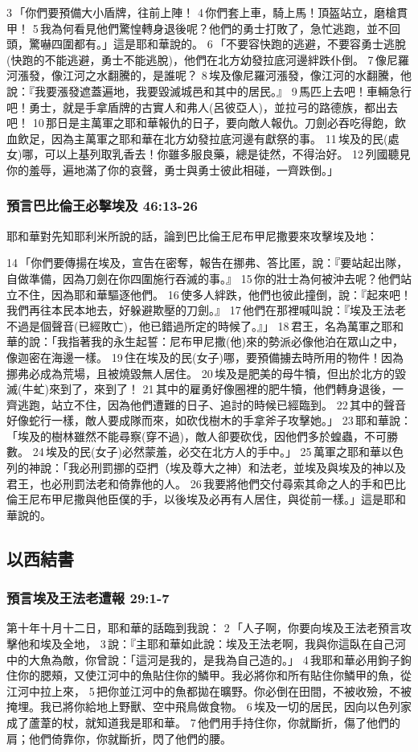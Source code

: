 3 「你們要預備大小盾牌，往前上陣！ 4 你們套上車，騎上馬！頂盔站立，磨槍貫甲！ 5 我為何看見他們驚惶轉身退後呢？他們的勇士打敗了，急忙逃跑，並不回頭，驚嚇四圍都有。」這是耶和華說的。 6 「不要容快跑的逃避，不要容勇士逃脫(快跑的不能逃避，勇士不能逃脫)，他們在北方幼發拉底河邊絆跌仆倒。 7 像尼羅河漲發，像江河之水翻騰的，是誰呢？ 8 埃及像尼羅河漲發，像江河的水翻騰，他說：『我要漲發遮蓋遍地，我要毀滅城邑和其中的居民。』 9 馬匹上去吧！車輛急行吧！勇士，就是手拿盾牌的古實人和弗人(呂彼亞人)，並拉弓的路德族，都出去吧！ 10 那日是主萬軍之耶和華報仇的日子，要向敵人報仇。刀劍必吞吃得飽，飲血飲足，因為主萬軍之耶和華在北方幼發拉底河邊有獻祭的事。 11 埃及的民(處女)哪，可以上基列取乳香去！你雖多服良藥，總是徒然，不得治好。 12 列國聽見你的羞辱，遍地滿了你的哀聲，勇士與勇士彼此相碰，一齊跌倒。」

\subsubsection{預言巴比倫王必擊埃及 46:13-26}
耶和華對先知耶利米所說的話，論到巴比倫王尼布甲尼撒要來攻擊埃及地：

14 「你們要傳揚在埃及，宣告在密奪，報告在挪弗、答比匿，說：『要站起出隊，自做準備，因為刀劍在你四圍施行吞滅的事。』 15 你的壯士為何被沖去呢？他們站立不住，因為耶和華驅逐他們。 16 使多人絆跌，他們也彼此撞倒，說：『起來吧！我們再往本民本地去，好躲避欺壓的刀劍。』 17 他們在那裡喊叫說：『埃及王法老不過是個聲音(已經敗亡)，他已錯過所定的時候了。』」 18 君王，名為萬軍之耶和華的說：「我指著我的永生起誓：尼布甲尼撒(他)來的勢派必像他泊在眾山之中，像迦密在海邊一樣。 19 住在埃及的民(女子)哪，要預備擄去時所用的物件！因為挪弗必成為荒場，且被燒毀無人居住。 20 埃及是肥美的母牛犢，但出於北方的毀滅(牛虻)來到了，來到了！ 21 其中的雇勇好像圈裡的肥牛犢，他們轉身退後，一齊逃跑，站立不住，因為他們遭難的日子、追討的時候已經臨到。 22 其中的聲音好像蛇行一樣，敵人要成隊而來，如砍伐樹木的手拿斧子攻擊她。」 23 耶和華說：「埃及的樹林雖然不能尋察(穿不過)，敵人卻要砍伐，因他們多於蝗蟲，不可勝數。 24 埃及的民(女子)必然蒙羞，必交在北方人的手中。」 25 萬軍之耶和華以色列的神說：「我必刑罰挪的亞捫（埃及尊大之神）和法老，並埃及與埃及的神以及君王，也必刑罰法老和倚靠他的人。 26 我要將他們交付尋索其命之人的手和巴比倫王尼布甲尼撒與他臣僕的手，以後埃及必再有人居住，與從前一樣。」這是耶和華說的。

\subsection{以西結書}
\subsubsection{預言埃及王法老遭報 29:1-7}
第十年十月十二日，耶和華的話臨到我說： 2 「人子啊，你要向埃及王法老預言攻擊他和埃及全地， 3 說：『主耶和華如此說：埃及王法老啊，我與你這臥在自己河中的大魚為敵，你曾說：「這河是我的，是我為自己造的。」 4 我耶和華必用鉤子鉤住你的腮頰，又使江河中的魚貼住你的鱗甲。我必將你和所有貼住你鱗甲的魚，從江河中拉上來， 5 把你並江河中的魚都拋在曠野。你必倒在田間，不被收殮，不被掩埋。我已將你給地上野獸、空中飛鳥做食物。 6 埃及一切的居民，因向以色列家成了蘆葦的杖，就知道我是耶和華。 7 他們用手持住你，你就斷折，傷了他們的肩；他們倚靠你，你就斷折，閃了他們的腰。

